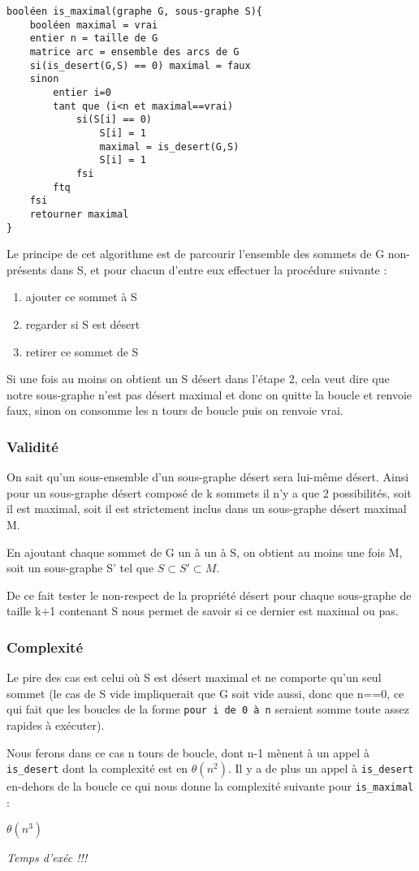 \begin{verbatim}
booléen is_maximal(graphe G, sous-graphe S){
    booléen maximal = vrai
    entier n = taille de G
    matrice arc = ensemble des arcs de G
    si(is_desert(G,S) == 0) maximal = faux
    sinon
        entier i=0
        tant que (i<n et maximal==vrai)
            si(S[i] == 0)
                S[i] = 1
                maximal = is_desert(G,S)
                S[i] = 1
            fsi
        ftq
    fsi
    retourner maximal
}
\end{verbatim}
Le principe de cet algorithme est de parcourir l'ensemble des sommets de G non-présents dans S, et pour chacun d'entre eux effectuer la procédure suivante :
\begin{enumerate}
	\item ajouter ce sommet à S
	\item regarder si S est désert 
	\item retirer ce sommet de S
\end{enumerate}
Si une fois au moins on obtient un S désert dans l'étape 2, cela veut dire que notre sous-graphe n'est pas désert maximal et donc on quitte la boucle et renvoie faux, sinon on consomme les n tours de boucle puis on renvoie vrai. 

\subsubsection{Validité}

On sait qu'un sous-ensemble d'un sous-graphe désert sera lui-même désert. Ainsi pour un sous-graphe désert composé de k sommets il n'y a que 2 possibilités, soit il est maximal, soit il est strictement inclus dans un sous-graphe désert maximal M. 

En ajoutant chaque sommet de G un à un à S, on obtient au moins une fois M, soit un sous-graphe S' tel que $S \subset S' \subset M$.

De ce fait tester le non-respect de la propriété \og désert \fg{} pour chaque sous-graphe de taille k+1 contenant S nous permet de savoir si ce dernier est maximal ou pas.

\subsubsection{Complexité}

Le pire des cas est celui où S est désert maximal et ne comporte qu'un seul sommet (le cas de S vide impliquerait que G soit vide aussi, donc que n==0, ce qui fait que les boucles de la forme \verb|pour i de 0 à n| seraient somme toute assez rapides à exécuter). 

Nous ferons dans ce cas n tours de boucle, dont n-1 mènent à un appel à \verb|is_desert| dont la complexité est en $\theta(n^2)$. Il y a de  plus un appel à \verb|is_desert| en-dehors de la boucle ce qui nous donne la complexité suivante pour \verb|is_maximal| : 

$\theta(n^3)$

\emph{Temps d'exéc !!!} 